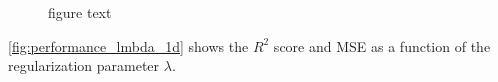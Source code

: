 \begin{figure}[H]
\qquad
{}
\qquad
{}
\caption{figure text}
\label{fig:j_lmbda}
\end{figure}


\autoref{fig:performance_lmbda_1d} shows the $R^2$ score and MSE as a function of the regularization parameter $\lambda$.


